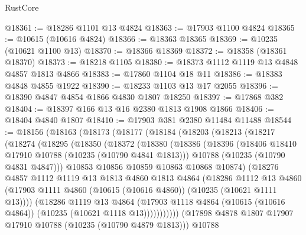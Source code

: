 \begin{lexlean}{RustCore}
\begin{coremodule}
@18361 := @18286 @1101 @13 @4824
@18363 := @17903 @1100 @4824
@18365 := @10615 (@10616 @4824)
@18366 := @18363 @18365
@18369 := @10235 (@10621 @1100 @13)
@18370 := @18366 @18369
@18372 := @18358 (@18361 @18370)
@18373 := @18218 @1105
@18380 := @18373 @1112 @1119 @13 @4848 @4857 @1813 @4866
@18383 := @17860 @1104 @18 @11
@18386 := @18383 @4848 @4855 @1922
@18390 := @18233 @1103 @13 @17 @2055
@18396 := @18390 @4847 @4854 @1866 @4830 @1807 @18250
@18397 := @17868 @382
@18404 := @18397 @166 @13 @16 @2380 @1813 @1908 @1866
@18406 := @18404 @4840 @1807
@18410 := @17903 @381 @2380 @11484 @11488
@18544 := @18156
    (@18163
      (@18173
        (@18177
          (@18184
            (@18203
              (@18213
                (@18217
                  (@18274
                    (@18295
                      (@18350
                        (@18372
                          (@18380
                            (@18386
                              (@18396
                                (@18406 @18410 @17910 @10788 (@10235 (@10790 @4841 @1813)))
                                @10788
                                (@10235 (@10790 @4831 @4847)))
                              @10853
                              @10856
                              @10859
                              @10863
                              @10868
                              @10874)
                            (@18276
                              @4857
                              @1112
                              @1119
                              @13
                              @1813
                              @4860
                              @1813
                              @4864
                              (@18286
                                @1112
                                @13
                                @4860
                                (@17903
                                  @1111
                                  @4860
                                  (@10615 (@10616 @4860))
                                  (@10235 (@10621 @1111 @13))))
                              (@18286
                                @1119
                                @13
                                @4864
                                (@17903
                                  @1118
                                  @4864
                                  (@10615 (@10616 @4864))
                                  (@10235 (@10621 @1118 @13)))))))))))
                (@17898 @4878 @1807 @17907 @17910 @10788 (@10235 (@10790 @4879 @1813)))
                @10788

\end{coremodule}
\end{lexlean}
